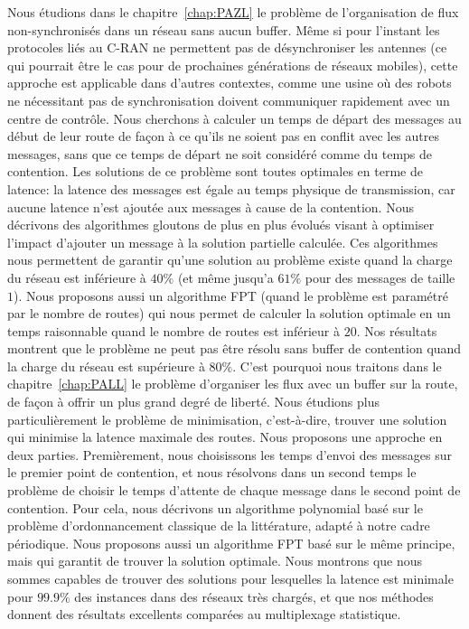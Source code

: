 Nous étudions dans le chapitre~\ref{chap:PAZL} le problème de l'organisation de flux non-synchronisés dans un réseau sans aucun buffer.
Même si pour l'instant les protocoles liés au C-RAN ne permettent pas de désynchroniser les antennes (ce qui pourrait être le cas pour de prochaines générations de réseaux mobiles), cette approche est applicable dans d'autres contextes, comme une usine où des robots ne nécessitant pas de synchronisation doivent communiquer rapidement avec un centre de contrôle.
Nous cherchons à calculer un temps de départ des messages au début de leur route de façon à ce qu'ils ne soient pas en conflit avec les autres messages, sans que ce temps de départ ne soit considéré comme du temps de contention.
Les solutions de ce problème sont toutes optimales en terme de latence: la latence des messages est égale au temps physique de transmission, car aucune latence n'est ajoutée aux messages à cause de la contention. Nous décrivons des algorithmes gloutons de plus en plus évolués visant à optimiser l'impact d'ajouter un message à la solution partielle calculée. Ces algorithmes nous permettent de garantir qu'une solution au problème existe quand la charge du réseau est inférieure à $40\%$ (et même jusqu'a $61\%$ pour des messages de taille $1$). Nous proposons aussi un algorithme FPT (quand le problème est paramétré par le nombre de routes) qui nous permet de calculer la solution optimale en un temps raisonnable quand le nombre de routes est inférieur à $20$. Nos résultats montrent que le problème ne peut pas être résolu sans buffer de contention quand la charge du réseau est supérieure à $80\%$.
C'est pourquoi nous traitons dans le chapitre~\ref{chap:PALL} le problème d'organiser les flux avec un buffer sur la route, de façon à offrir un plus grand degré de liberté. Nous étudions plus particulièrement le problème de minimisation, c'est-à-dire, trouver une solution qui minimise la latence maximale des routes. Nous proposons une approche en deux parties. Premièrement, nous choisissons les temps d'envoi des messages sur le premier point de contention, et nous résolvons dans un second temps le problème de choisir le temps d'attente de chaque message dans le second point de contention. Pour cela, nous décrivons un algorithme polynomial basé sur le problème d'ordonnancement classique de la littérature, adapté à notre cadre périodique. Nous proposons aussi un algorithme FPT basé sur le même principe, mais qui garantit de trouver la solution optimale. Nous montrons que nous sommes capables de trouver des solutions pour lesquelles la latence est minimale pour $99.9\%$ des instances dans des réseaux très chargés, et que nos méthodes donnent des résultats excellents comparées au multiplexage statistique.

